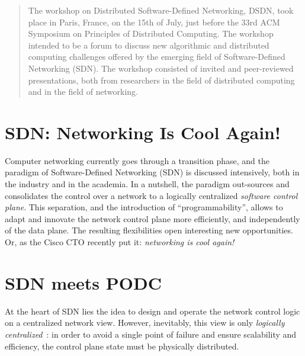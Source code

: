 \documentclass[11pt,pdftex,letter]{article}
\def\SAVESPACE{1}
\begin{document}
\thispagestyle{empty}





\begin{abstract}
The workshop on Distributed Software-Defined Networking, DSDN, took
place in Paris, France, on the 15th of July, just before
the 33rd ACM Symposium on Principles of Distributed Computing.
The workshop intended to be a forum to discuss new algorithmic and
distributed computing challenges offered by the emerging field of
Software-Defined Networking (SDN).
The workshop consisted of invited and peer-reviewed presentations, both
from researchers in the field of
distributed computing and in the field of networking.
\end{abstract}


\section{SDN: Networking Is Cool Again!}

Computer networking currently goes through a transition phase,
and the paradigm of Software-Defined Networking (SDN)
is discussed intensively, both in the industry and in the academia. In
a nutshell, the paradigm out-sources and consolidates the control over a network
to a logically centralized \emph{software control plane}.
This separation, and the introduction of ``programmability'',
allows to adapt and innovate the network control plane more
efficiently, and independently of the data plane.
The resulting flexibilities open interesting new opportunities. Or, as the Cisco CTO recently put it:
\emph{networking is cool again!}

\section{SDN meets PODC}

At the heart of SDN lies the idea to design and operate
the network control logic
on a centralized network view.
However, inevitably, this view is only \emph{logically centralized}~\cite{onix,kandoo,hotsdn13loc,log-cent}:
in order to avoid a single point of failure and ensure scalability and efficiency,
the control plane state must
be physically distributed.
\end{document}
